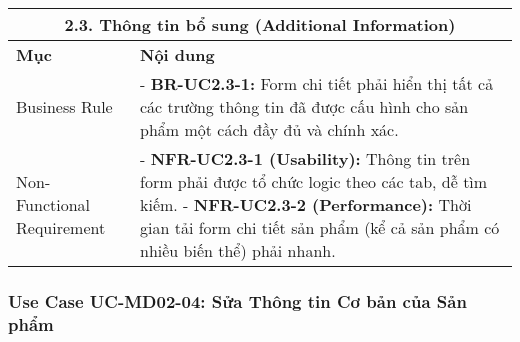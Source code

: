 \begin{longtable}{|m{4cm}|p{11cm}|}
\hline
\multicolumn{2}{|c|}{\textbf{2.3. Thông tin bổ sung (Additional Information)}} \\
\hline
\textbf{Mục} & \textbf{Nội dung} \\
\hline
Business Rule & - \textbf{BR-UC2.3-1:} Form chi tiết phải hiển thị tất cả các trường thông tin đã được cấu hình cho sản phẩm một cách đầy đủ và chính xác. \\
\hline
Non-Functional Requirement & - \textbf{NFR-UC2.3-1 (Usability):} Thông tin trên form phải được tổ chức logic theo các tab, dễ tìm kiếm. \newline - \textbf{NFR-UC2.3-2 (Performance):} Thời gian tải form chi tiết sản phẩm (kể cả sản phẩm có nhiều biến thể) phải nhanh. \\
\hline
\end{longtable}

\subsubsection{Use Case UC-MD02-04: Sửa Thông tin Cơ bản của Sản phẩm}

